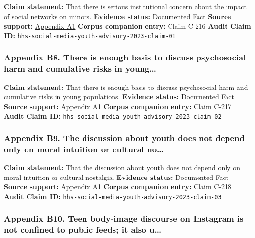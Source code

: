 \documentclass[
  american,
  11pt,
  letterpaper,
]{article}
\begin{document}
\textbf{Claim statement:} That there is serious institutional concern
about the impact of social networks on minors. \textbf{Evidence status:}
Documented Fact \textbf{Source support:}
\hyperref[appendix-a1-social-media-and-youth-mental-health-the-u-s-surgeon-general-s-advisory]{Appendix
A1} \textbf{Corpus companion entry:} Claim C-216 \textbf{Audit Claim
ID:} \texttt{hhs-social-media-youth-advisory-2023-claim-01}

\subsubsection{Appendix B8. There is enough basis to discuss
psychosocial harm and cumulative risks in
young\ldots{}}\label{appendix-b8-there-is-enough-basis-to-discuss-psychosocial-harm-and-cumulative-risks-in-young}

\textbf{Claim statement:} That there is enough basis to discuss
psychosocial harm and cumulative risks in young populations.
\textbf{Evidence status:} Documented Fact \textbf{Source support:}
\hyperref[appendix-a1-social-media-and-youth-mental-health-the-u-s-surgeon-general-s-advisory]{Appendix
A1} \textbf{Corpus companion entry:} Claim C-217 \textbf{Audit Claim
ID:} \texttt{hhs-social-media-youth-advisory-2023-claim-02}

\subsubsection{Appendix B9. The discussion about youth does not depend
only on moral intuition or cultural
no\ldots{}}\label{appendix-b9-the-discussion-about-youth-does-not-depend-only-on-moral-intuition-or-cultural-no}

\textbf{Claim statement:} That the discussion about youth does not
depend only on moral intuition or cultural nostalgia. \textbf{Evidence
status:} Documented Fact \textbf{Source support:}
\hyperref[appendix-a1-social-media-and-youth-mental-health-the-u-s-surgeon-general-s-advisory]{Appendix
A1} \textbf{Corpus companion entry:} Claim C-218 \textbf{Audit Claim
ID:} \texttt{hhs-social-media-youth-advisory-2023-claim-03}

\subsubsection{Appendix B10. Teen body-image discourse on Instagram is
not confined to public feeds; it also
u\ldots{}}\label{appendix-b10-teen-body-image-discourse-on-instagram-is-not-confined-to-public-feeds-it-also-u}
\end{document}
